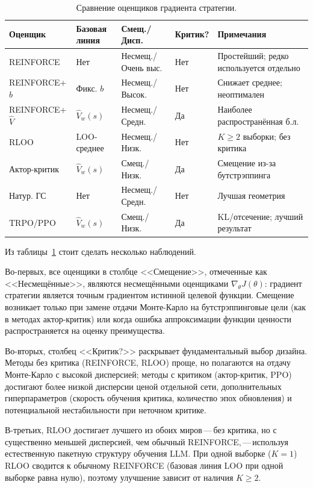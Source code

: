 \begin{table}[ht]
\centering
\caption{Сравнение оценщиков градиента стратегии.}
\label{tab:pg-comparison-ch8}
\small
\begin{tabular}{@{}llllp{3.2cm}@{}}
\toprule
\textbf{Оценщик} & \textbf{Базовая линия} & \textbf{Смещ./Дисп.} & \textbf{Критик?} & \textbf{Примечания} \\
\midrule
REINFORCE & Нет & Несмещ./Очень выс. & Нет & Простейший; редко используется отдельно \\
\addlinespace
REINFORCE+$b$ & Фикс. $b$ & Несмещ./Высок. & Нет & Снижает среднее; неоптимален \\
\addlinespace
REINFORCE+$\hat V$ & $\hat V_w(s)$ & Несмещ./Средн. & Да & Наиболее распространённая б.л. \\
\addlinespace
RLOO & LOO-среднее & Несмещ./Низк. & Нет & $K\!\geq\!2$ выборки; без критика \\
\addlinespace
Актор-критик & $\hat V_w(s)$ & Смещ./Низк. & Да & Смещение из-за бутстрэппинга \\
\addlinespace
Натур. ГС & Нет & Несмещ./Средн. & Нет & Лучшая геометрия \\
\addlinespace
TRPO/PPO & $\hat V_w(s)$ & Смещ./Низк. & Да & KL/отсечение; лучший результат \\
\bottomrule
\end{tabular}
\end{table}

Из таблицы~\ref{tab:pg-comparison-ch8} стоит сделать несколько наблюдений.

Во-первых, все оценщики в столбце <<Смещение>>, отмеченные как <<Несмещённые>>, являются несмещёнными оценщиками $\nabla_\theta J(\theta)$: градиент стратегии является точным градиентом истинной целевой функции. Смещение возникает только при замене отдачи Монте-Карло на бутстрэппинговые цели (как в методах актор-критик) или когда ошибка аппроксимации функции ценности распространяется на оценку преимущества.

Во-вторых, столбец <<Критик?>> раскрывает фундаментальный выбор дизайна. Методы без критика (REINFORCE, RLOO) проще, но полагаются на отдачу Монте-Карло с высокой дисперсией; методы с критиком (актор-критик, PPO) достигают более низкой дисперсии ценой отдельной сети, дополнительных гиперпараметров (скорость обучения критика, количество эпох обновления) и потенциальной нестабильности при неточном критике.

В-третьих, RLOO достигает лучшего из обоих миров\,---\,без критика, но с существенно меньшей дисперсией, чем обычный REINFORCE,\,---\,используя естественную пакетную структуру обучения LLM. При одной выборке ($K=1$) RLOO сводится к обычному REINFORCE (базовая линия LOO при одной выборке равна нулю), поэтому улучшение зависит от наличия $K \geq 2$.

